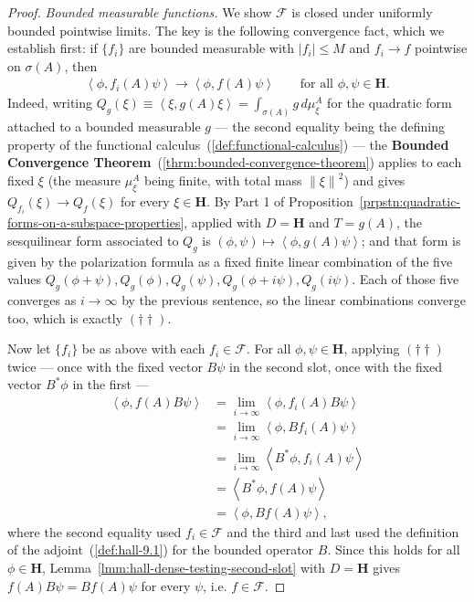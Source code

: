 \begin{proof}
\textit{Bounded measurable functions.} We show $\mathcal{F}$ is closed under uniformly bounded pointwise limits. The key is the following convergence fact, which we establish first: if $\{f_i\}$ are bounded measurable with $\lvert f_i \rvert \le M$ and $f_i \to f$ pointwise on $\sigma(A)$, then
\begin{align}
    \left< \phi, f_i(A)\psi \right> \longrightarrow \left< \phi, f(A)\psi \right> \qquad \text{for all } \phi,\psi \in \mathbf{H}. \tag{$\dagger\dagger$}
\end{align}
Indeed, writing $Q_g(\xi) \equiv \left< \xi, g(A)\xi \right> = \int_{\sigma(A)} g \, d\mu^A_\xi$ for the quadratic form attached to a bounded measurable $g$ — the second equality being the defining property of the functional calculus~(\ref{def:functional-calculus}) — the \textbf{Bounded Convergence Theorem}~(\ref{thrm:bounded-convergence-theorem}) applies to each fixed $\xi$ (the measure $\mu^A_\xi$ being finite, with total mass $\left\| \xi \right\|^2$) and gives $Q_{f_i}(\xi) \to Q_f(\xi)$ for every $\xi \in \mathbf{H}$. By Part 1 of Proposition~\ref{prpstn:quadratic-forms-on-a-subspace-properties}, applied with $D = \mathbf{H}$ and $T = g(A)$, the sesquilinear form associated to $Q_g$ is $(\phi,\psi) \mapsto \left< \phi, g(A)\psi \right>$; and that form is given by the polarization formula as a fixed finite linear combination of the five values $Q_g(\phi+\psi), Q_g(\phi), Q_g(\psi), Q_g(\phi+i\psi), Q_g(i\psi)$. Each of those five converges as $i \to \infty$ by the previous sentence, so the linear combinations converge too, which is exactly $(\dagger\dagger)$.

Now let $\{f_i\}$ be as above with each $f_i \in \mathcal{F}$. For all $\phi,\psi \in \mathbf{H}$, applying $(\dagger\dagger)$ twice — once with the fixed vector $B\psi$ in the second slot, once with the fixed vector $B^*\phi$ in the first —
\begin{align}
    \left< \phi, f(A)B\psi \right> &= \lim_{i\to\infty} \left< \phi, f_i(A)B\psi \right> \\
                &= \lim_{i\to\infty} \left< \phi, Bf_i(A)\psi \right> \\
                &= \lim_{i\to\infty} \left< B^*\phi, f_i(A)\psi \right> \\
                &= \left< B^*\phi, f(A)\psi \right> \\
                &= \left< \phi, Bf(A)\psi \right>,
\end{align}
where the second equality used $f_i \in \mathcal{F}$ and the third and last used the definition of the adjoint~(\ref{def:hall-9.1}) for the bounded operator $B$. Since this holds for all $\phi \in \mathbf{H}$, Lemma~\ref{lmm:hall-dense-testing-second-slot} with $D = \mathbf{H}$ gives $f(A)B\psi = Bf(A)\psi$ for every $\psi$, i.e. $f \in \mathcal{F}$.


\end{proof}
